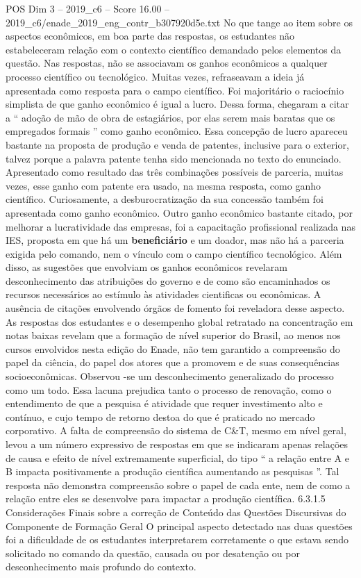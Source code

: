 \begin{textsample}{POS Dim 3 – 2019\_c6 – Score 16.00 – 2019\_c6/enade\_2019\_eng\_contr\_b307920d5e.txt}
No que tange ao item sobre os aspectos econômicos, em boa parte das respostas, os estudantes não estabeleceram relação com o contexto científico demandado pelos elementos da questão.
Nas respostas, não se associavam os ganhos econômicos a qualquer processo científico ou tecnológico.
Muitas vezes, refraseavam a ideia já apresentada como resposta para o campo científico.
Foi majoritário o raciocínio simplista de que ganho econômico é igual a lucro.
Dessa forma, chegaram a citar a “ adoção de mão de obra de estagiários, por elas serem mais baratas que os empregados formais ” como ganho econômico.
Essa concepção de lucro apareceu bastante na proposta de produção e venda de patentes, inclusive para o exterior, talvez porque a palavra patente tenha sido mencionada no texto do enunciado.
Apresentado como resultado das três combinações possíveis de parceria, muitas vezes, esse ganho com patente era usado, na mesma resposta, como ganho científico.
Curiosamente, a desburocratização da sua concessão também foi apresentada como ganho econômico.
Outro ganho econômico bastante citado, por melhorar a lucratividade das empresas, foi a capacitação profissional realizada nas IES, proposta em que há um \textbf{beneficiário} e um doador, mas não há a parceria exigida pelo comando, nem o vínculo com o campo científico tecnológico.
Além disso, as sugestões que envolviam os ganhos econômicos revelaram desconhecimento das atribuições do governo e de como são encaminhados os recursos necessários ao estímulo às atividades cientificas ou econômicas.
A ausência de citações envolvendo órgãos de fomento foi reveladora desse aspecto.
As respostas dos estudantes e o desempenho global retratado na concentração em notas baixas revelam que a formação de nível superior do Brasil, ao menos nos cursos envolvidos nesta edição do Enade, não tem garantido a compreensão do papel da ciência, do papel dos atores que a promovem e de suas consequências socioeconômicas.
Observou -se um desconhecimento generalizado do processo como um todo.
Essa lacuna prejudica tanto o processo de renovação, como o entendimento de que a pesquisa é atividade que requer investimento alto e contínuo, e cujo tempo de retorno destoa do que é praticado no mercado corporativo.
A falta de compreensão do sistema de C\&T, mesmo em nível geral, levou a um número expressivo de respostas em que se indicaram apenas relações de causa e efeito de nível extremamente superficial, do tipo “ a relação entre A e B impacta positivamente a produção científica aumentando as pesquisas ”.
Tal resposta não demonstra compreensão sobre o papel de cada ente, nem de como a relação entre eles se desenvolve para impactar a produção científica. 6.3.1.5 Considerações Finais sobre a correção de Conteúdo das Questões Discursivas do Componente de Formação Geral O principal aspecto detectado nas duas questões foi a dificuldade de os estudantes interpretarem corretamente o que estava sendo solicitado no comando da questão, causada ou por desatenção ou por desconhecimento mais profundo do contexto.

\end{textsample}
